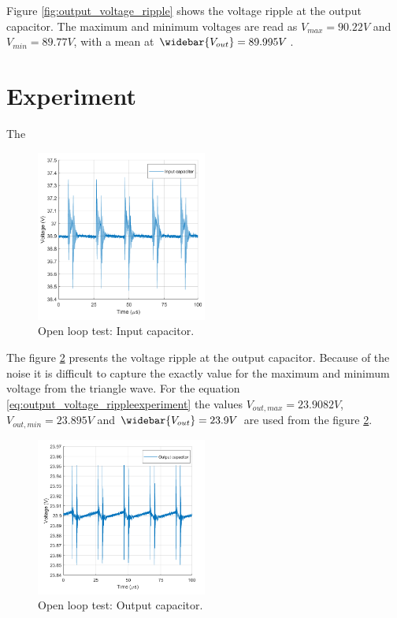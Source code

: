Figure \ref{fig:output_voltage_ripple} shows the voltage ripple at the output capacitor. The maximum and minimum voltages are read as $V_{max} = 90.22V$ and $V_{min} = 89.77V$, with a mean at $\widebar{V_{out}} = 89.995V$.

\section{Experiment}

The

\begin{figure}[H]
	\begin{center}
		\includegraphics[width=0.5\textwidth]{../Pictures/P1/Test/Openloopinputcapacitor}
		\caption{Open loop test: Input capacitor.}
		\label{Openlooptestinputcapacitor}
	\end{center}	
\end{figure}

The figure \ref{Openlooptestoutputtcapacitor} presents the voltage ripple at the output capacitor. Because of the noise it is difficult to capture the exactly value for the maximum and minimum voltage from the triangle wave. For the equation \ref{eq:output_voltage_rippleexperiment} the values $V_{out,max} = 23.9082V$, $V_{out,min} = 23.895V$ and $\widebar{V_{out}} = 23.9V$ are used from the figure  \ref{Openlooptestoutputtcapacitor}.

\begin{figure}[H]
	\begin{center}
		\includegraphics[width=0.5\textwidth]{../Pictures/P1/Test/Openloopoutputcapacitor}
		\caption{Open loop test: Output capacitor.}
		\label{Openlooptestoutputtcapacitor}
	\end{center}	
\end{figure}


